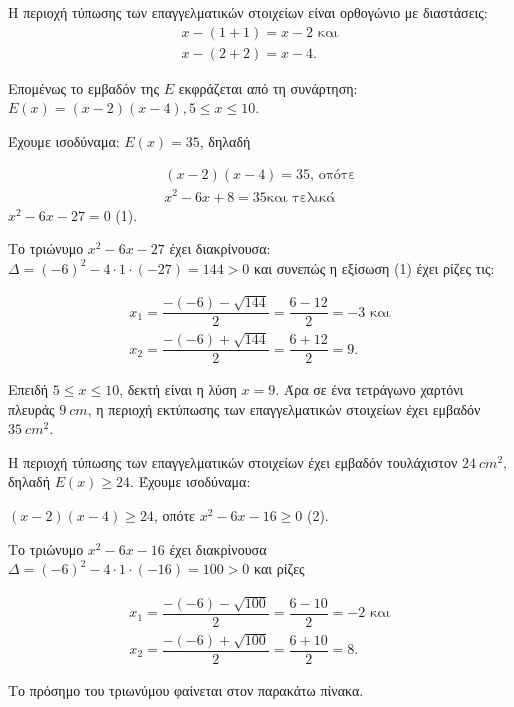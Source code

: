 
\begin{alist}
\item Η περιοχή τύπωσης των επαγγελματικών στοιχείων είναι ορθογώνιο με διαστάσεις:
\begin{gather*}
x - (1 + 1) = x - 2\text{ και} \\
x - (2 + 2) = x - 4.
\end{gather*}

Επομένως το εμβαδόν της $E$ εκφράζεται από τη συνάρτηση:
$E(x) = (x - 2)(x - 4), 5 \le x \le 10$.

\item Έχουμε ισοδύναμα:
$E(x) = 35$, δηλαδή

\begin{gather*}
(x - 2)(x - 4) = 35\text{, οπότε} \\
x^2 - 6x + 8 = 35\text{και τελικά}
\end{gather*}
$x^2 - 6x - 27 = 0$ (1).

Το τριώνυμο $x^2 - 6x - 27$ έχει διακρίνουσα:
$\Delta = (-6)^2 - 4 \cdot 1 \cdot (-27) = 144 > 0$ και συνεπώς η εξίσωση (1) έχει ρίζες τις:

\begin{gather*}
x_1 = \dfrac{-(-6) - \sqrt{144}}{2} = \dfrac{6 - 12}{2} = -3\text{ και} \\
x_2 = \dfrac{-(-6) + \sqrt{144}}{2} = \dfrac{6 + 12}{2} = 9.
\end{gather*}

Επειδή $5 \le x \le 10$, δεκτή είναι η λύση $x = 9$.
Άρα σε ένα τετράγωνο χαρτόνι πλευράς $\SI{9}{cm}$, η περιοχή εκτύπωσης των επαγγελματικών στοιχείων έχει εμβαδόν $\SI{35}{cm^2}$.

\item Η περιοχή τύπωσης των επαγγελματικών στοιχείων έχει εμβαδόν τουλάχιστον $\SI{24}{cm^2}$, δηλαδή $E(x) \ge 24$. Έχουμε ισοδύναμα:

$(x - 2)(x - 4) \ge 24$, οπότε
$x^2 - 6x - 16 \ge 0$ (2).

Το τριώνυμο $x^2 - 6x - 16$ έχει διακρίνουσα $\Delta = (-6)^2 - 4 \cdot 1 \cdot (-16) = 100 > 0$ και ρίζες

\begin{gather*}
x_1 = \dfrac{-(-6) - \sqrt{100}}{2} = \dfrac{6 - 10}{2} = -2\text{ και} \\
x_2 = \dfrac{-(-6) + \sqrt{100}}{2} = \dfrac{6 + 10}{2} = 8.
\end{gather*}

Το πρόσημο του τριωνύμου φαίνεται στον παρακάτω πίνακα.


\end{alist}

